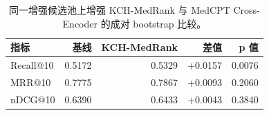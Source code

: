 \begin{table}[t]
\centering
\small
\caption{同一增强候选池上增强 KCH-MedRank 与 MedCPT Cross-Encoder 的成对 bootstrap 比较。}
\label{tab:enhanced-bioasq-significance}
\begin{tabular}{lrrrr}
\toprule
指标 & 基线 & KCH-MedRank & 差值 & p 值 \\
\midrule
Recall@10 & 0.5172 & 0.5329 & +0.0157 & 0.0076 \\
MRR@10 & 0.7775 & 0.7867 & +0.0093 & 0.2060 \\
nDCG@10 & 0.6390 & 0.6433 & +0.0043 & 0.3840 \\
\bottomrule
\end{tabular}
\end{table}
